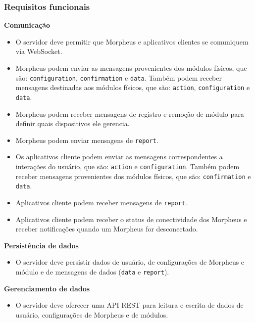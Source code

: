\subsubsection{Requisitos funcionais}
\begin{description}

\item \textbf{Comunicação}

\begin{itemize}
\item O servidor deve permitir que Morpheus e aplicativos clientes se comuniquem via WebSocket.
\item Morpheus podem enviar as mensagens provenientes dos módulos físicos, que são: \texttt{configuration}, \texttt{confirmation} e \texttt{data}. Também podem receber mensagens destinadas aos módulos físicos, que são: \texttt{action}, \texttt{configuration} e \texttt{data}.
\item Morpheus podem receber mensagens de registro e remoção de módulo para definir quais dispositivos ele gerencia.
\item Morpheus podem enviar mensagens de \texttt{report}.
\item Os aplicativos cliente podem enviar as mensagens correspondentes a interações do usuário, que são: \texttt{action} e \texttt{configuration}. Também podem receber mensagens provenientes dos módulos físicos, que são: \texttt{confirmation} e \texttt{data}.
\item Aplicativos cliente podem receber mensagens de \texttt{report}.
\item Aplicativos cliente podem receber o status de conectividade dos Morpheus e receber notificações quando um Morpheus for desconectado.
\end{itemize}

\item \textbf{Persistência de dados}

\begin{itemize}
\item O servidor deve persistir dados de usuário, de configurações de Morpheus e módulo e de mensagens de dados (\texttt{data} e \texttt{report}).
\end{itemize}

\item \textbf{Gerenciamento de dados}

\begin{itemize}
\item O servidor deve oferecer uma API REST para leitura e escrita de dados de usuário, configurações de Morpheus e de módulos.
\end{itemize}

\end{description}


